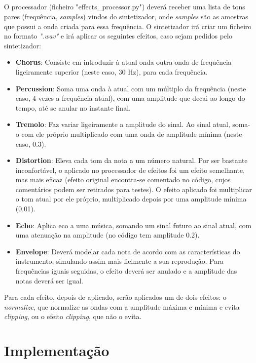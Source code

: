 \documentclass[11pt,openany,twoside]{report}
\begin{document}
\paragraph{ } O processador (ficheiro "effects\_processor.py") deverá receber uma lista de tons pares (frequência, \textit{samples}) vindos do sintetizador, onde \textit{samples} são as amostras que possui a onda criada para essa frequência. O sintetizador irá criar um ficheiro no formato \textit{".wav"} e irá aplicar os seguintes efeitos, caso sejam pedidos pelo sintetizador:
\begin{itemize}
\item \textbf{Chorus}: Consiste em introduzir à atual onda outra onda de frequência ligeiramente superior (neste caso, 30 Hz), para cada frequência.
\item \textbf{Percussion}: Soma uma onda à atual com um múltiplo da frequência (neste caso, 4 vezes a frequência atual), com uma amplitude que decai ao longo do tempo, até se anular no instante final.
\item \textbf{Tremolo}: Faz variar ligeiramente a amplitude do sinal. Ao sinal atual, soma-o com ele próprio multiplicado com uma onda de amplitude mínima (neste caso, 0.3).
\item \textbf{Distortion}: Eleva cada tom da nota a um número natural. Por ser bastante inconfortável, o aplicado no processador de efeitos foi um efeito semelhante, mas mais eficaz (efeito original encontra-se comentado no código, cujos comentários podem ser retirados para testes). O efeito aplicado foi multiplicar o tom atual por ele próprio, multiplicado depois por uma amplitude mínima (0.01).
\item \textbf{Echo}: Aplica eco a uma música, somando um sinal futuro ao sinal atual, com uma atenuação na amplitude (no código tem amplitude 0.2).
\item \textbf{Envelope}: Deverá modelar cada nota de acordo com as características do instrumento, simulando assim mais fielmente a sua reprodução. Para frequências iguais seguidas, o efeito deverá ser anulado e a amplitude das notas deverá ser igual.
\end{itemize}


Para cada efeito, depois de aplicado, serão aplicados um de dois efeitos: o \textit{normalize}, que normalize as ondas com a amplitude máxima e mínima e evita \textit{clipping}, ou o efeito \textit{clipping}, que não o evita.

\chapter{Implementação}
\end{document}
